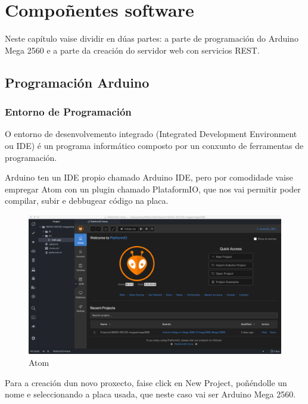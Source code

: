 \documentclass[11pt,twoside]{book}
\begin{document}
\chapter{Compoñentes software}

Neste capítulo vaise dividir en dúas partes: a parte de programación do Arduino Mega 2560 e a parte da creación do servidor web con servicios REST.

\section{Programación Arduino}

\subsection{Entorno de Programación}

O entorno de desenvolvemento integrado (Integrated Development Environment ou IDE) é un programa informático composto por un conxunto de ferramentas de programación. 

Arduino ten un IDE propio chamado Arduino IDE, pero por comodidade vaise empregar Atom con un plugin chamado PlataformIO, que nos vai permitir poder compilar, subir e debbugear código na placa.

\begin{figure}[H]
	\begin{center}
		\includegraphics[width=15cm]{images/Atom.png}
	\end{center}
	\caption{Atom}
	\label{fig:Atom}
\end{figure}

Para a creación dun novo proxecto, faise click en New Project, poñéndolle un nome e seleccionando a placa usada, que neste caso vai ser Arduino Mega 2560.
\end{document}
